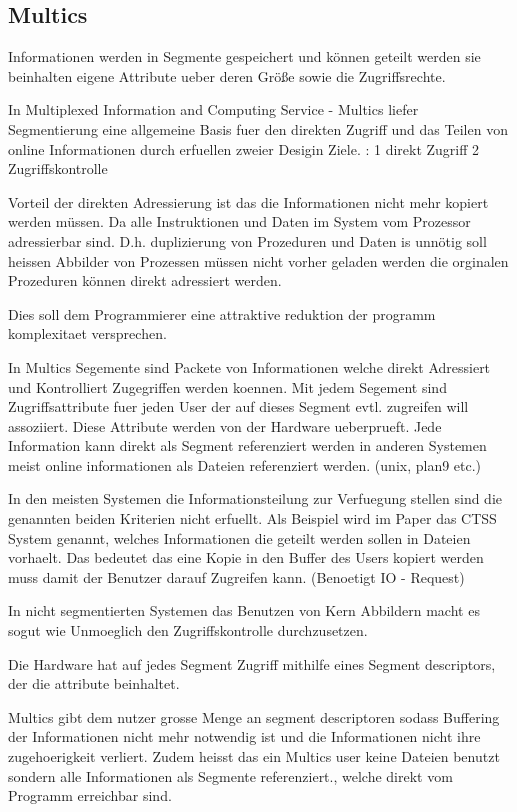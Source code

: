 \documentclass[9pt,technote]{IEEEtran}
\begin{document}
   \subsection{Multics}  
   
   Informationen werden in Segmente gespeichert und k\"onnen geteilt werden sie beinhalten eigene Attribute 
   ueber deren Gr\"o\ss e sowie die Zugriffsrechte.
   
   In Multiplexed Information and Computing Service - Multics  liefer Segmentierung eine allgemeine Basis fuer den direkten Zugriff
   und das Teilen von online Informationen durch erfuellen zweier Desigin Ziele. : 1 direkt Zugriff 2 Zugriffskontrolle
   
   Vorteil der direkten Adressierung ist das die Informationen nicht mehr kopiert werden m\"ussen. Da alle Instruktionen und Daten
   im System vom Prozessor adressierbar sind. D.h. duplizierung von Prozeduren und Daten is unn\"otig soll heissen Abbilder von Prozessen m\"ussen
   nicht vorher geladen werden die orginalen Prozeduren k\"onnen direkt adressiert werden.
   
  Dies soll dem Programmierer eine attraktive reduktion der programm komplexitaet versprechen.
  
  In Multics Segemente sind Packete von Informationen welche direkt Adressiert und Kontrolliert Zugegriffen werden koennen.
  Mit jedem Segement sind Zugriffsattribute fuer jeden User der auf dieses Segment evtl. zugreifen will assoziiert.
  Diese Attribute werden von der Hardware ueberprueft. Jede Information kann direkt als Segment referenziert werden
  in anderen Systemen meist online informationen als Dateien referenziert werden. (unix, plan9 etc.)
  
  In den meisten Systemen die Informationsteilung zur Verfuegung stellen sind die genannten beiden Kriterien nicht erfuellt.
  Als Beispiel wird im Paper \cite{inproc:multics} das CTSS System genannt, welches Informationen die geteilt werden sollen in Dateien vorhaelt.
  Das bedeutet das eine Kopie in den Buffer des Users kopiert werden muss damit der Benutzer darauf Zugreifen kann. (Benoetigt IO - Request)
  
  In nicht segmentierten Systemen das Benutzen von Kern Abbildern macht es sogut wie Unmoeglich den Zugriffskontrolle durchzusetzen.
  
 Die Hardware hat auf jedes Segment Zugriff mithilfe eines Segment descriptors, der die attribute beinhaltet.
 
 Multics gibt dem nutzer grosse Menge an segment descriptoren sodass Buffering der Informationen nicht mehr notwendig ist und die Informationen nicht
 ihre zugehoerigkeit verliert. Zudem heisst das ein Multics user keine Dateien benutzt sondern alle Informationen als Segmente referenziert., welche direkt vom Programm erreichbar sind.
 
\end{document}
